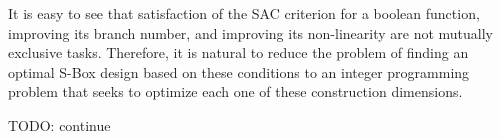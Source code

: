 \documentclass[11pt]{article}
\begin{document}
It is easy to see that satisfaction of the SAC criterion for a boolean function, improving its branch number, and improving its non-linearity are not mutually exclusive tasks. Therefore, it is natural to reduce the problem of finding an optimal S-Box design based on these conditions to an integer programming problem that seeks to optimize each one of these construction dimensions.

TODO: continue

\begin{comment}
Key distribution is a vital part of wireless ad-hoc communication networks that need to transfer text, audio, and video data both securely and efficiently. Traditionally, key agreement protocols are based upon the commonly known Diffie Hellman key exchange protocol, in which two (or more) parties may exchange public information in order to establish a common key. The problem with this approach is that it is very computationally inefficient, and doesn't lend itself directly to the problem of establishing a single common group key among multiple parties in a group. This is especially true in wireless ad-hoc networks where the nodes themselves have constrained processing and power resources.

For this reason, key agreement schemes for this specific type of network typically rely on pre-placed information that can be easily distributed to members of the group in order to establish a common group key. Therefore, at the physical layer of the network, where the group topology is represented as a single spanning tree, it is important that the latency of sending data between two nodes is as small as possible in order to ensure the fastest transmission of data. Depending on the radio propagation model and specific waveform used to propagate the digital data via an analog signal to each of the nodes, the structure of this tree can have a drastic impact on the time it takes to distribute a specific piece of data from node to every other node in the group.

Therefore, the purpose of this project is to minimize the time it takes this data to transmit to every other node in the group depending on the following parameters:

\begin{enumerate}
	\item Number of slots available in the TDMA scheme 
	\item Maximum number of nodes in the network
	\item Maximum number of node children allowed in the spanning tree
	\item Data packet size
	\item Radio channel bandwidth
\end{enumerate}

\end{comment}
\end{document}
